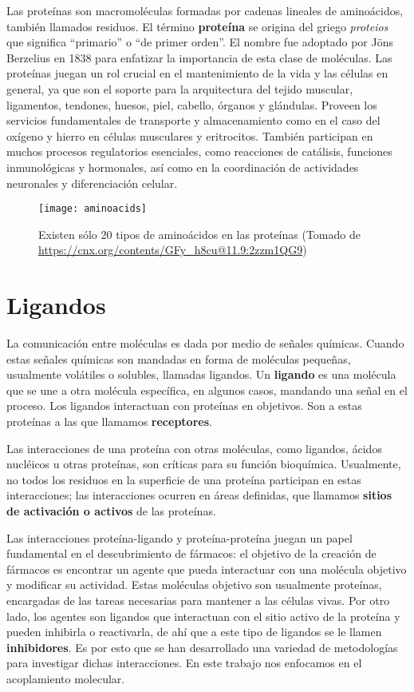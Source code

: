 Las proteínas son macromoléculas formadas por cadenas lineales de
aminoácidos, también llamados residuos. El término \textbf{proteína}
se origina del griego \textit{proteios} que significa ``primario'' o
``de primer orden''. El nombre fue adoptado por Jöns Berzelius en 1838
para enfatizar la importancia de esta clase de moléculas. Las
proteínas juegan un rol crucial en el mantenimiento de la vida y las
células en general, ya que son el soporte para la arquitectura del
tejido muscular, ligamentos, tendones, huesos, piel, cabello, órganos
y glándulas. Proveen los servicios fundamentales de transporte y
almacenamiento como en el caso del oxígeno y hierro en células
musculares y eritrocitos. También participan en muchos procesos
regulatorios esenciales, como reacciones de catálisis, funciones
inmunológicas y hormonales, así como en la coordinación de actividades
neuronales y diferenciación celular.\cite{tamar}

\begin{figure}[H]
  \texttt{[image: aminoacids]} \centering
  \caption{Existen sólo 20 tipos de aminoácidos en las proteínas
  (Tomado de \url{https://cnx.org/contents/GFy_h8cu@11.9:2zzm1QG9})}
\end{figure}

\section{Ligandos}
La comunicación entre moléculas es dada por medio de señales químicas.
Cuando estas señales químicas son mandadas en forma de moléculas
pequeñas, usualmente volátiles o solubles, llamadas ligandos.
Un \textbf{ligando} es una molécula que se une a otra molécula
específica, en algunos casos, mandando una señal en el proceso. Los
ligandos interactuan con proteínas en objetivos. Son a estas proteínas
a las que llamamos \textbf{receptores}.

Las interacciones de una proteína con otras moléculas, como ligandos,
ácidos nucléicos u otras proteínas, son críticas para su función
bioquímica. Usualmente, no todos los residuos en la superficie de una
proteína participan en estas interacciones; las interacciones ocurren
en áreas definidas, que llamamos \textbf{sitios de activación o
activos} de las proteínas.

Las interacciones proteína-ligando y proteína-proteína juegan un papel
fundamental en el descubrimiento de fármacos: el objetivo de la
creación de fármacos es encontrar un agente que pueda interactuar con
una molécula objetivo y modificar su actividad. Estas moléculas
objetivo son usualmente proteínas, encargadas de las tareas necesarias
para mantener a las células vivas. Por otro lado, los agentes son
ligandos que interactuan con el sitio activo de la proteína y pueden
inhibirla o reactivarla, de ahí que a este tipo de ligandos se le
llamen \textbf{inhibidores}. Es por esto que se han desarrollado una
variedad de metodologías para investigar dichas interacciones. En este
trabajo nos enfocamos en el acoplamiento molecular.

